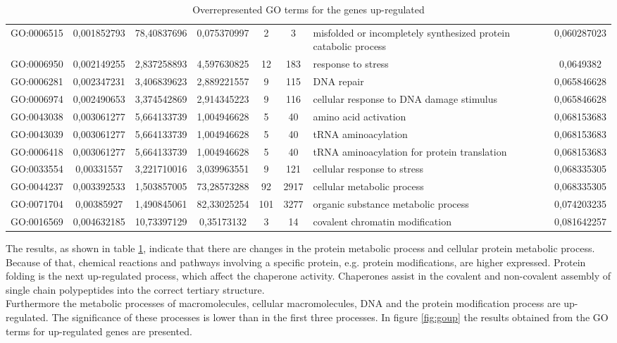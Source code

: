 \documentclass[12pt, a4paper]{report}
\newcommand{\HT}[1]{\textcolor{red}{#1}}
\begin{document}
\begin{table}[H]
\begin{tabular}{c|c|c|c|c|c|p{}|c}
GO:0006515&	0,001852793&	78,40837696&	0,075370997&	2&	3&	misfolded or incompletely synthesized protein catabolic process&	0,060287023\\
GO:0006950&	0,002149255&	2,837258893&	4,597630825&	12&	183&	response to stress&	0,0649382\\
GO:0006281&	0,002347231&	3,406839623&	2,889221557&	9&	115&	DNA repair&	0,065846628\\
GO:0006974&	0,002490653&	3,374542869&	2,914345223&	9&	116&	cellular response to DNA damage stimulus&	0,065846628\\
GO:0043038&	0,003061277&	5,664133739&	1,004946628&	5&	40&	amino acid activation&	0,068153683\\
GO:0043039&	0,003061277&	5,664133739&	1,004946628&	5&	40&	tRNA aminoacylation&	0,068153683\\
GO:0006418&	0,003061277&	5,664133739&	1,004946628&	5&	40&	tRNA aminoacylation for protein translation&	0,068153683\\
GO:0033554&	0,00331557&	3,221710016&	3,039963551&	9&	121&	cellular response to stress&	0,068335305\\
GO:0044237&	0,003392533&	1,503857005&	73,28573288&	92&	2917&	cellular metabolic process&	0,068335305\\
GO:0071704&	0,00385927&	1,490845061&	82,33025254&	101&	3277&	organic substance metabolic process&	0,074203235\\
GO:0016569&	0,004632185&	10,73397129&	0,35173132&	3&	14&	covalent chromatin modification&	0,081642257\\
\hline
\end{tabular}
\caption{Overrepresented GO terms for the genes up-regulated}
\label{tab:GOup}
\end{table}

The results, as shown in table \ref{tab:GOup}, indicate that there are changes in the protein metabolic process and cellular protein metabolic process. Because of that, chemical reactions and pathways involving a specific protein, e.g. protein modifications, are higher expressed. 
Protein folding is the next up-regulated process, which affect the chaperone activity. Chaperones assist in the covalent and non-covalent assembly of single chain polypeptides into the correct tertiary structure. \\
Furthermore the metabolic processes of macromolecules, cellular macromolecules, DNA and the protein modification process are up-regulated. The significance of these processes is lower than in the first three processes. In figure \ref{fig:goup} the results obtained from the GO terms for up-regulated genes are presented. 
\end{document}
